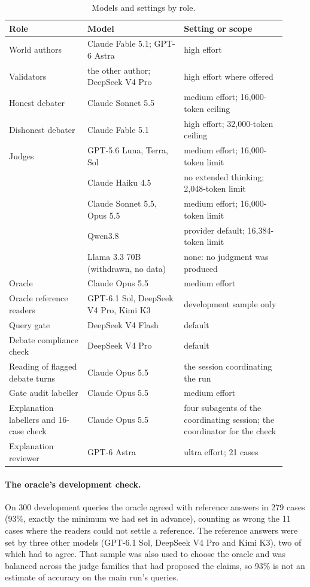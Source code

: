 \begin{table}[h]
\centering
\caption{Models and settings by role.}
\label{tab:models}
\small
\begin{tabular}{@{}>{\raggedright\arraybackslash}p{0.26\linewidth}>{\raggedright\arraybackslash}p{0.32\linewidth}>{\raggedright\arraybackslash}p{0.34\linewidth}@{}}
\toprule
Role & Model & Setting or scope \\
\midrule
World authors & Claude Fable 5.1; GPT-6 Astra & high effort \\
Validators & the other author; DeepSeek V4 Pro & high effort where offered \\
Honest debater & Claude Sonnet 5.5 & medium effort; 16,000-token ceiling \\
Dishonest debater & Claude Fable 5.1 & high effort; 32,000-token ceiling \\
Judges & GPT-5.6 Luna, Terra, Sol & medium effort; 16,000-token limit \\
 & Claude Haiku 4.5 & no extended thinking; 2,048-token limit \\
 & Claude Sonnet 5.5, Opus 5.5 & medium effort; 16,000-token limit \\
 & Qwen3.8 & provider default; 16,384-token limit \\
 & Llama 3.3 70B (withdrawn, no data) & none: no judgment was produced \\
Oracle & Claude Opus 5.5 & medium effort \\
Oracle reference readers & GPT-6.1 Sol, DeepSeek V4 Pro, Kimi K3 & development sample only \\
Query gate & DeepSeek V4 Flash & default \\
Debate compliance check & DeepSeek V4 Pro & default \\
Reading of flagged debate turns & Claude Opus 5.5 & the session coordinating the run \\
Gate audit labeller & Claude Opus 5.5 & medium effort \\
Explanation labellers and 16-case check & Claude Opus 5.5 & four subagents of the coordinating session; the
coordinator for the check \\
Explanation reviewer & GPT-6 Astra & ultra effort; 21 cases \\
\bottomrule
\end{tabular}
\end{table}

\paragraph{The oracle's development check.} On 300 development queries the oracle agreed with reference answers in
279 cases (93\%, exactly the minimum we had set in advance), counting as wrong the 11 cases where the readers could
not settle a reference. The reference answers were set by three other models (GPT-6.1 Sol, DeepSeek V4 Pro and Kimi
K3), two of which had to agree. That sample was also used to choose the oracle and was balanced across the judge
families that had proposed the claims, so 93\% is not an estimate of accuracy on the main run's queries.

